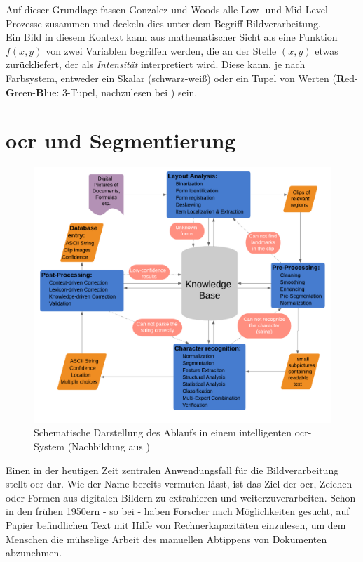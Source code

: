		Auf dieser Grundlage fassen Gonzalez und Woods alle Low- und Mid-Level Prozesse zusammen und deckeln dies unter dem Begriff Bildverarbeitung. \\
		
		Ein Bild in diesem Kontext kann aus mathematischer Sicht als eine Funktion $f(x, y)$ von zwei Variablen begriffen werden, die an der Stelle $(x, y)$ etwas zurückliefert, der als \textit{Intensität} interpretiert wird. Diese kann, je nach Farbsystem, entweder ein Skalar (schwarz-weiß) oder ein Tupel von Werten (\textbf{R}ed-\textbf{G}reen-\textbf{B}lue: 3-Tupel, nachzulesen bei \cite{rgb-info}) sein. 
	
	
	\section{\gls{ocr} und Segmentierung}
	
		\begin{figure}[H]
			\centering
			\includegraphics[width=\linewidth]{Ablauf-OCR_Cheriet-et-al.pdf}
			\caption[typisches \gls{ocr}-Ablaufschema]{Schematische Darstellung des 
				Ablaufs in einem intelligenten \gls{ocr}-System (Nachbildung aus 
				\cite[Seite 7]{cher-et-al-ocr})}
			\label{fig:ocr-system}
		\end{figure}
	
		Einen in der heutigen Zeit zentralen Anwendungsfall für die Bildverarbeitung stellt \gls{ocr} dar. Wie der Name bereits vermuten lässt, ist das Ziel der \gls{ocr}, Zeichen oder Formen aus digitalen Bildern zu extrahieren und weiterzuverarbeiten. Schon in den frühen 1950ern - so bei \cite{cher-et-al-ocr} - haben Forscher nach Möglichkeiten gesucht, auf Papier befindlichen Text mit Hilfe von Rechnerkapazitäten einzulesen, um dem Menschen die mühselige Arbeit des manuellen Abtippens von Dokumenten abzunehmen.


